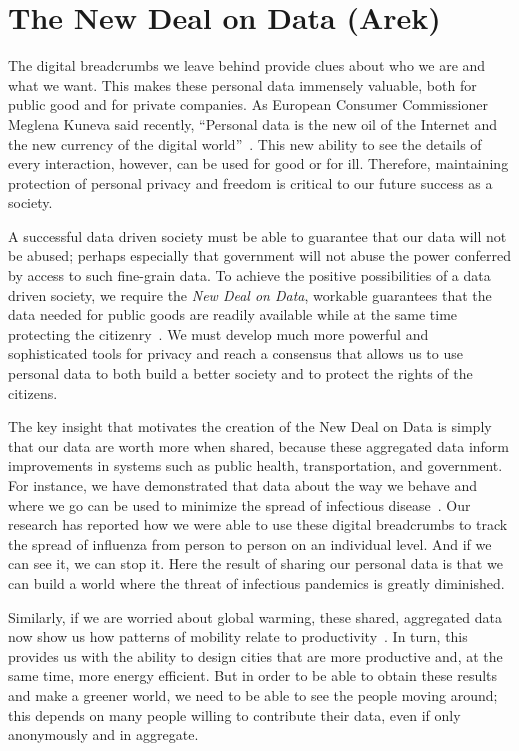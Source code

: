 \section{The New Deal on Data (Arek)}

The digital breadcrumbs we leave behind provide clues about who we are and what we want.
This makes these personal data immensely valuable, both for public good and for private companies.
As European Consumer Commissioner Meglena Kuneva said recently, ``Personal data is the new oil of the Internet and the new currency of the digital world''~\cite{kuneva2009}.
This new ability to see the details of every interaction, however, can be used for good or for ill.
Therefore, maintaining protection of personal privacy and freedom is critical to our future success as a society.

A successful data driven society must be able to guarantee that our data will not be abused; perhaps especially that government will not abuse the power conferred by access to such fine-grain data.
To achieve the positive possibilities of a data driven society, we require the \emph{New Deal on Data}, workable guarantees that the data needed for public goods are readily available while at the same time protecting the citizenry~\cite{pentland2009reality}.
We must develop much more powerful and sophisticated tools for privacy and reach a consensus that allows us to use personal data to both build a better society and to protect the rights of the citizens.

The key insight that motivates the creation of the New Deal on Data is simply that our data are worth more when shared, because these aggregated data inform improvements in systems such as public health, transportation, and government.
For instance, we have demonstrated that data about the way we behave and where we go can be used to minimize the spread of infectious disease~\cite{madan2010social, pentland2009using}.
Our research has reported how we were able to use these digital breadcrumbs to track the spread of influenza from person to person on an individual level.
And if we can see it, we can stop it.
Here the result of sharing our personal data is that we can build a world where the threat of infectious pandemics is greatly diminished.

Similarly, if we are worried about global warming, these shared, aggregated data now show us how patterns of mobility relate to productivity~\cite{pan2013urban}.
In turn, this provides us with the ability to design cities that are more productive and, at the same time, more energy efficient.
But in order to be able to obtain these results and make a greener world, we need to be able to see the people moving around; this depends on many people willing to contribute their data, even if only anonymously and in aggregate.


